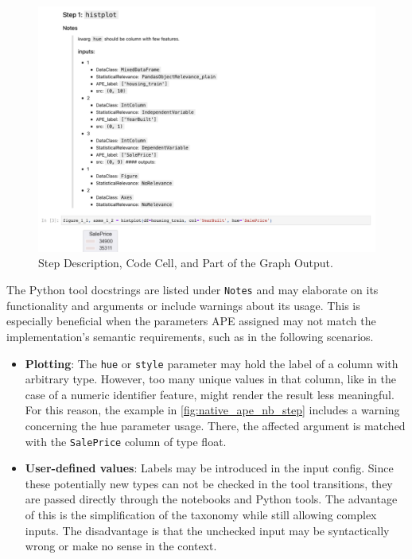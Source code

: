 \begin{figure}
    \centering
    \includegraphics[width=\textwidth]{Tex/images/native_ape_nb_step.png}
    \caption{Step Description, Code Cell, and Part of the Graph Output.}
    \label{fig:native_ape_nb_step}
\end{figure}

The Python tool docstrings are listed under \verb|Notes| and may elaborate on its functionality and arguments or include warnings about its usage. This is especially beneficial when the parameters APE assigned may not match the implementation's semantic requirements, such as in the following scenarios.
\begin{itemize}
    \item \textbf{Plotting}: The \verb|hue| or \verb|style| parameter may hold the label of a column with arbitrary type. However, too many unique values in that column, like in the case of a numeric identifier feature, might render the result less meaningful. For this reason, the example in \autoref{fig:native_ape_nb_step} includes a warning concerning the hue parameter usage. There, the affected argument is matched with the \verb|SalePrice| column of type float.
    \item \textbf{User-defined values}: Labels may be introduced in the input config. Since these potentially new types can not be checked in the tool transitions, they are passed directly through the notebooks and Python tools. The advantage of this is the simplification of the taxonomy while still allowing complex inputs. The disadvantage is that the unchecked input may be syntactically wrong or make no sense in the context.
\end{itemize}

